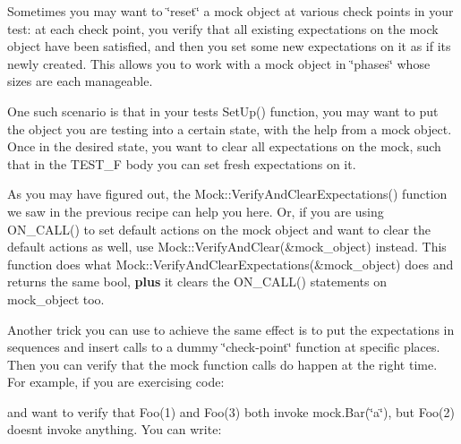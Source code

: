 Sometimes you may want to \char`\"{}reset\char`\"{} a mock object at various check points in your test\+: at each check point, you verify that all existing expectations on the mock object have been satisfied, and then you set some new expectations on it as if it\textquotesingle{}s newly created. This allows you to work with a mock object in \char`\"{}phases\char`\"{} whose sizes are each manageable.

One such scenario is that in your test\textquotesingle{}s {\ttfamily Set\+Up()} function, you may want to put the object you are testing into a certain state, with the help from a mock object. Once in the desired state, you want to clear all expectations on the mock, such that in the {\ttfamily T\+E\+S\+T\+\_\+F} body you can set fresh expectations on it.

As you may have figured out, the {\ttfamily Mock\+::\+Verify\+And\+Clear\+Expectations()} function we saw in the previous recipe can help you here. Or, if you are using {\ttfamily O\+N\+\_\+\+C\+A\+L\+L()} to set default actions on the mock object and want to clear the default actions as well, use {\ttfamily Mock\+::\+Verify\+And\+Clear(\&mock\+\_\+object)} instead. This function does what {\ttfamily Mock\+::\+Verify\+And\+Clear\+Expectations(\&mock\+\_\+object)} does and returns the same {\ttfamily bool}, {\bfseries{plus}} it clears the {\ttfamily O\+N\+\_\+\+C\+A\+L\+L()} statements on {\ttfamily mock\+\_\+object} too.

Another trick you can use to achieve the same effect is to put the expectations in sequences and insert calls to a dummy \char`\"{}check-\/point\char`\"{} function at specific places. Then you can verify that the mock function calls do happen at the right time. For example, if you are exercising code\+:


\begin{DoxyCode}{0}
\end{DoxyCode}


and want to verify that {\ttfamily Foo(1)} and {\ttfamily Foo(3)} both invoke {\ttfamily mock.\+Bar(\char`\"{}a\char`\"{})}, but {\ttfamily Foo(2)} doesn\textquotesingle{}t invoke anything. You can write\+:


\begin{DoxyCode}{0}
\DoxyCodeLine{}
\DoxyCodeLine{  \{}
\DoxyCodeLine{}
\DoxyCodeLine{  \}}
\DoxyCodeLine{\}}
\end{DoxyCode}


